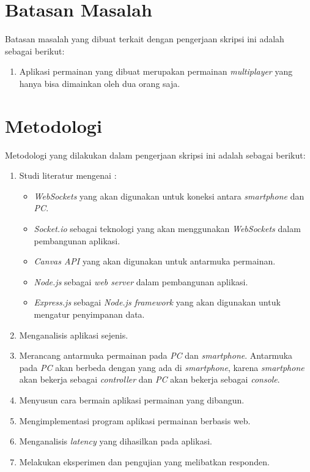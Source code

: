 \section{Batasan Masalah}
\label{sec:batasan}

Batasan masalah yang dibuat terkait dengan pengerjaan skripsi ini adalah sebagai berikut:

\begin{enumerate}
	\item Aplikasi permainan yang dibuat merupakan permainan \textit{multiplayer} yang hanya bisa dimainkan oleh dua orang saja.
\end{enumerate}


\section{Metodologi}
\label{sec:metlit}
Metodologi yang dilakukan dalam pengerjaan skripsi ini adalah sebagai berikut:

\begin{enumerate}
	\item Studi literatur mengenai :
		\begin{itemize}
			\item \textit{WebSockets} yang akan digunakan untuk koneksi antara \textit{smartphone} dan \textit{PC}.
			\item \textit{Socket.io} sebagai teknologi yang akan menggunakan \textit{WebSockets} dalam pembangunan aplikasi.
			\item \textit{Canvas API} yang akan digunakan untuk antarmuka permainan.
			\item \textit{Node.js} sebagai \textit{web server} dalam pembangunan aplikasi. 	
			\item \textit{Express.js} sebagai \textit{Node.js framework} yang akan digunakan untuk mengatur penyimpanan data.
		\end{itemize}
	\item Menganalisis aplikasi sejenis.
	\item Merancang antarmuka permainan pada \textit{PC} dan \textit{smartphone}. Antarmuka pada \textit{PC} akan berbeda dengan yang ada di \textit{smartphone}, karena \textit{smartphone} akan bekerja sebagai \textit{controller} dan \textit{PC} akan bekerja sebagai \textit{console}.
	\item Menyusun cara bermain aplikasi permainan yang dibangun.
	\item Mengimplementasi program aplikasi permainan berbasis web.
	\item Menganalisis \textit{latency} yang dihasilkan pada aplikasi.
	\item Melakukan eksperimen dan pengujian yang melibatkan responden.
\end{enumerate}

